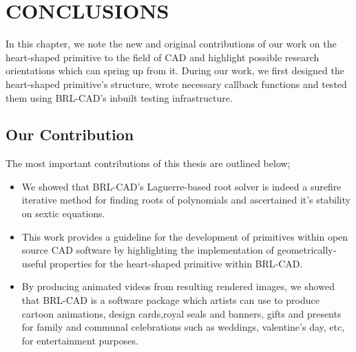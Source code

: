 \chapter{CONCLUSIONS}

\hspace{30} In   this   chapter,   we   note   the   new   and   original   contributions   of   our   work   on  
the   heart-­shaped   primitive   to   the   field   of   CAD   and   highlight  
possible   research   orientations   which   can   spring   up   from   it.   During   our   work,   we  
first   designed   the   heart­-shaped   primitive's   structure,   wrote   necessary   callback  
functions and tested them using BRL-­CAD's inbuilt testing infrastructure. 


\section{Our Contribution}

The most important contributions of this thesis are outlined below;  

\begin{itemize}
\item We   showed   that   BRL-­CAD's   Laguerre-­based   root   solver   is   indeed   a  
sure­fire   iterative   method   for   finding   roots   of   polynomials   and   ascertained  
it's stability on sextic equations.  
\item This   work   provides   a   guideline   for   the   development   of   primitives   within  
open   source   CAD   software   by   highlighting   the  implementation   of   
geometrically­ useful properties for the heart-shaped primitive within BRL-­CAD.
\item By   producing   animated   videos   from   resulting   rendered   images,   we  
showed   that   BRL­-CAD   is   a   software   package   which   artists   can   use   to  
produce   cartoon   animations,   design   cards,royal   seals   and   banners,   gifts  
and   presents   for   family   and   communal   celebrations   such   as   weddings,  
valentine's day, etc, for entertainment purposes.
\end{itemize}

